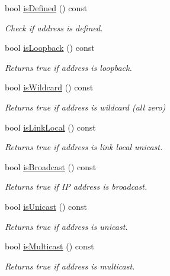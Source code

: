 \begin{DoxyCompactItemize}
bool \hyperlink{classostk_1_1io_1_1ip_1_1_address_a04478bd4c7c226c0fe7043ef63ec48d1}{is\+Defined} () const
\begin{DoxyCompactList}\small\item\em Check if address is defined. \end{DoxyCompactList}\item 
bool \hyperlink{classostk_1_1io_1_1ip_1_1_address_aed5c82ceb025f23bcf17b5a76f1c4758}{is\+Loopback} () const
\begin{DoxyCompactList}\small\item\em Returns true if address is loopback. \end{DoxyCompactList}\item 
bool \hyperlink{classostk_1_1io_1_1ip_1_1_address_ae099697de04ec30bac8f9d371ec02e14}{is\+Wildcard} () const
\begin{DoxyCompactList}\small\item\em Returns true if address is wildcard (all zero) \end{DoxyCompactList}\item 
bool \hyperlink{classostk_1_1io_1_1ip_1_1_address_a8e4414026c04ae1143f3a388d025de53}{is\+Link\+Local} () const
\begin{DoxyCompactList}\small\item\em Returns true if address is link local unicast. \end{DoxyCompactList}\item 
bool \hyperlink{classostk_1_1io_1_1ip_1_1_address_a90251b4663992d0e64d3708da55006a9}{is\+Broadcast} () const
\begin{DoxyCompactList}\small\item\em Returns true if IP address is broadcast. \end{DoxyCompactList}\item 
bool \hyperlink{classostk_1_1io_1_1ip_1_1_address_a5e8adc78088668c77ab9ddf486892a85}{is\+Unicast} () const
\begin{DoxyCompactList}\small\item\em Returns true if address is unicast. \end{DoxyCompactList}\item 
bool \hyperlink{classostk_1_1io_1_1ip_1_1_address_aee49b8e42c67256b4627f29126bb1209}{is\+Multicast} () const
\begin{DoxyCompactList}\small\item\em Returns true if address is multicast. \end{DoxyCompactList}\item 

\end{DoxyCompactItemize}
